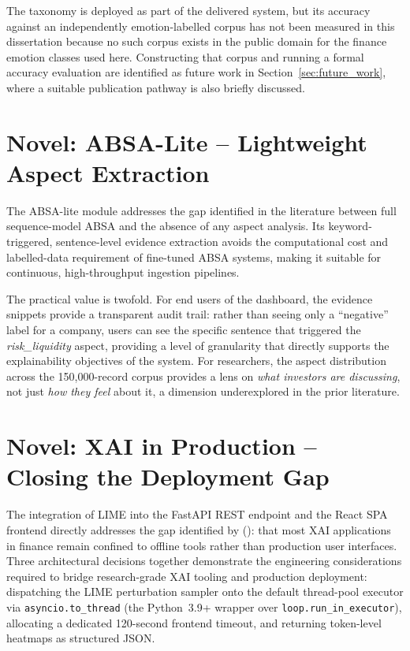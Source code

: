 The taxonomy is deployed as part of the delivered system, but its accuracy against an independently emotion-labelled corpus has not been measured in this dissertation because no such corpus exists in the public domain for the finance emotion classes used here. Constructing that corpus and running a formal accuracy evaluation are identified as future work in Section~\ref{sec:future_work}, where a suitable publication pathway is also briefly discussed.

\section{Novel: ABSA-Lite -- Lightweight Aspect Extraction}

The ABSA-lite module addresses the gap identified in the literature between full sequence-model ABSA \citep{pontiki2014semeval} and the absence of any aspect analysis.  Its keyword-triggered, sentence-level evidence extraction avoids the computational cost and labelled-data requirement of fine-tuned ABSA systems, making it suitable for continuous, high-throughput ingestion pipelines.

The practical value is twofold.  For end users of the dashboard, the evidence snippets provide a transparent audit trail: rather than seeing only a ``negative'' label for a company, users can see the specific sentence that triggered the \textit{risk\_liquidity} aspect, providing a level of granularity that directly supports the explainability objectives of the system.  For researchers, the aspect distribution across the 150{,}000-record corpus provides a lens on \textit{what investors are discussing}, not just \textit{how they feel} about it, a dimension underexplored in the prior literature.

\section{Novel: XAI in Production -- Closing the Deployment Gap}

The integration of LIME into the FastAPI REST endpoint and the React SPA frontend directly addresses the gap identified by \citeauthor{yeo2023xai} (\citeyear{yeo2023xai}): that most XAI applications in finance remain confined to offline tools rather than production user interfaces.  Three architectural decisions together demonstrate the engineering considerations required to bridge research-grade XAI tooling and production deployment: dispatching the LIME perturbation sampler onto the default thread-pool executor via \texttt{asyncio.to\_thread} (the Python~3.9+ wrapper over \texttt{loop.run\_in\_executor}), allocating a dedicated 120-second frontend timeout, and returning token-level heatmaps as structured JSON.

